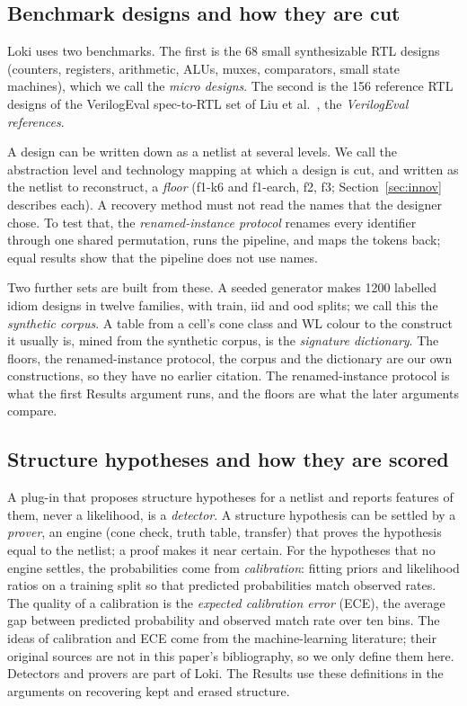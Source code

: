 \documentclass[conference]{IEEEtran}
\begin{document}
\subsection{Benchmark designs and how they are cut}
\label{sec:bg-floors}

Loki uses two benchmarks. The first is the 68 small synthesizable RTL designs (counters, registers,
arithmetic, ALUs, muxes, comparators, small state machines), which we call the \emph{micro designs}. %
The second is the 156 reference RTL designs of the VerilogEval spec-to-RTL set of Liu et al.~\cite{liu2023verilogeval}, the \emph{VerilogEval references}. %

A design can be written down as a netlist at several levels. We call the abstraction level and technology
mapping at which a design is cut, and written as the netlist to reconstruct, a \emph{floor} %
(f1-k6 and f1-earch, f2, f3; Section~\ref{sec:innov} describes each).
A recovery method must not read the names that the designer chose. To test that, the
\emph{renamed-instance protocol} renames every identifier through one shared permutation, %
runs the pipeline, and maps the tokens back; equal results show that the pipeline does not use names.

Two further sets are built from these. A seeded generator makes 1200 labelled idiom designs in twelve families,
with train, iid and ood splits; we call this the \emph{synthetic corpus}. %
A table from a cell's cone class and WL colour to the construct it usually is, mined from the synthetic corpus,
is the \emph{signature dictionary}. %
The floors, the renamed-instance protocol, the corpus and the dictionary are our own constructions, so they have no earlier citation. The renamed-instance protocol is what the first Results argument runs, and the floors are what the later arguments compare.

\subsection{Structure hypotheses and how they are scored}

A plug-in that proposes structure hypotheses for a netlist and reports features of them, never a
likelihood, is a \emph{detector}. %
A structure hypothesis can be settled by a \emph{prover}, an engine (cone check, truth table, transfer) %
that proves the hypothesis equal to the netlist; a proof makes it near certain. For the hypotheses that
no engine settles, the probabilities come from \emph{calibration}: %
fitting priors and likelihood ratios on a training split so that predicted probabilities match observed
rates. The quality of a calibration is the \emph{expected calibration error} (ECE), %
the average gap between predicted probability and observed match rate over ten bins. The ideas of calibration and ECE come from the machine-learning literature; their original sources are not in this paper's bibliography, so we only define them here. Detectors and provers are part of Loki. The Results use these definitions in the arguments on recovering kept and erased structure.
\end{document}
